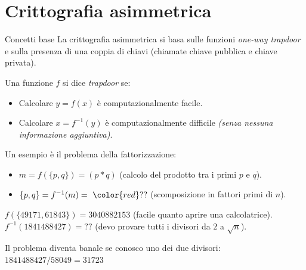 \documentclass[xcolor=dvipsnames,aspectratio=169]{beamer}
\begin{document}

\part{Crittografia asimmetrica}

\begin{frame}
	\partpage
	\centering
\end{frame}

\begin{frame}{Concetti base}
  La crittografia asimmetrica si basa sulle funzioni \textit{one-way trapdoor} e sulla presenza di una coppia di chiavi (chiamate chiave pubblica e chiave privata).
  
  \pause
  
  \medskip
  
  Una funzione $f$ si dice \textit{trapdoor} se: 
  \begin{itemize}
    \item Calcolare $y = f(x)$ è computazionalmente facile.
    \item Calcolare $x = f^{-1}(y)$ è computazionalmente difficile \textit{(senza nessuna informazione aggiuntiva)}.
  \end{itemize}

  \pause
  
  \smallskip
  
  Un esempio è il problema della fattorizzazione:
  \begin{itemize}
    \item $m = f(\{p, q\}) = (p * q)$ (calcolo del prodotto tra i primi $p$ e $q$).
    \item $\{p, q\} = f^{-1}(m) =\ {\color{red}??} $ (scomposizione in fattori primi di $n$).
  \end{itemize}
    
  \smallskip
  
  \pause
  
  $f(\{49171, 61843\}) = 3040882153$ (facile quanto aprire una calcolatrice).
  $f^{-1}(1841488427) = ??$ (devo provare tutti i divisori da $2$ a $\sqrt{n}$).
  
  \pause
  
  Il problema diventa banale se conosco uno dei due divisori:
  $1841488427 / 58049 = 31723$

\end{frame}
\end{document}
